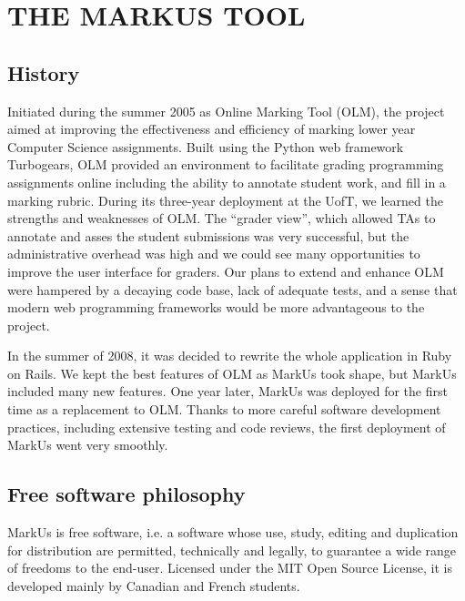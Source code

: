 \documentclass[twocolumn,10pt]{asme2e}
\begin{document}
\section*{THE MARKUS TOOL}



\subsection*{History}

Initiated during the summer 2005 as Online Marking Tool (OLM), the project aimed
at improving the effectiveness and efficiency of marking lower year Computer
Science assignments. Built using the Python web framework Turbogears, OLM
provided an environment to facilitate grading programming assignments online including the ability to annotate student work, and fill in a marking rubric. During its three-year deployment at the UofT, we learned the strengths and weaknesses of OLM. The ``grader view'', which allowed TAs to annotate and asses the student submissions was very successful, but the administrative overhead was high and we could see many opportunities to improve the user interface for graders. Our plans to extend and enhance OLM were hampered by a decaying code base, lack of adequate tests, and a sense that modern web programming frameworks would be more advantageous to the project.

In the summer of 2008, it was decided to rewrite the whole application in Ruby on Rails. We kept the best features of OLM as MarkUs took shape, but MarkUs included many new features. One year later, MarkUs was deployed for the first time as a replacement to OLM. Thanks to more careful software development practices, including extensive testing and code reviews, the first deployment of MarkUs went very smoothly.

\subsection*{Free software philosophy}
MarkUs is free software, i.e. a software whose use, study, editing and duplication for distribution are permitted, technically and legally, to guarantee a wide range of freedoms to the end-user. Licensed under the MIT Open Source License, it is developed mainly by Canadian and French students.
\end{document}

